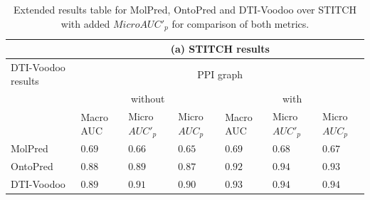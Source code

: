 \documentclass[]{article}
\newcommand{\name}{DTI-Voodoo}
\begin{document}
\clearpage

\begin{table}[ht]
	\centering
	\begin{tabular}{|p{2.0cm}|p{0.8cm}|p{0.8cm}|p{0.8cm}|p{0.8cm}|p{0.8cm}|p{0.8cm}|}
		\hline
		&\multicolumn{6}{c|}{(a) STITCH results}\\
		\hline
		\name{} results&\multicolumn{6}{c|}{PPI graph}\\
		&\multicolumn{3}{c|}{without}&\multicolumn{3}{c|}{with}\\
		&Macro AUC&Micro $AUC'_p$&Micro $AUC_p$&Macro AUC&Micro $AUC'_p$&Micro $AUC_p$\\
		\hline
		MolPred&$0.69$&$0.66$&$0.65$&$0.69$&$0.68$&$0.67$\\
		\hline
		OntoPred&$0.88$&$0.89$&$0.87$&$0.92$&$0.94$&$0.93$\\
		\hline
		\name{} & $0.89$& $0.91$ & $0.90$&$\mathbf{0.93}$&$\mathbf{0.94}$&$\mathbf{0.94}$\\
		\hline
	\end{tabular}
	\caption{Extended results table for MolPred, OntoPred and \name{} over STITCH with added $MicroAUC'_p$ for comparison of both metrics.}
\end{table}
\end{document}
